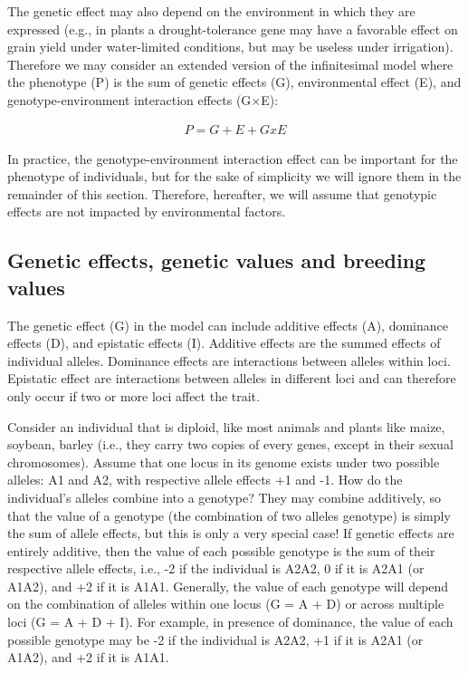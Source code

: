 \documentclass[
]{book}
\begin{document}
The genetic effect may also depend on the environment in which they are expressed (e.g., in plants a drought-tolerance gene may have a favorable effect on grain yield under water-limited conditions, but may be useless under irrigation). Therefore we may consider an extended version of the infinitesimal model where the phenotype (P) is the sum of genetic effects (G), environmental effect (E), and genotype-environment interaction effects (G×E):

\begin{align}
P = G + E + GxE
\end{align}

In practice, the genotype-environment interaction effect can be important for the phenotype of individuals, but for the sake of simplicity we will ignore them in the remainder of this section. Therefore, hereafter, we will assume that genotypic effects are not impacted by environmental factors.

\hypertarget{genetic-effects-genetic-values-and-breeding-values}{%
\subsection{Genetic effects, genetic values and breeding values}\label{genetic-effects-genetic-values-and-breeding-values}}

The genetic effect (G) in the model can include additive effects (A), dominance effects (D), and epistatic effects (I). Additive effects are the summed effects of individual alleles. Dominance effects are interactions between alleles within loci. Epistatic effect are interactions between alleles in different loci and can therefore only occur if two or more loci affect the trait.

Consider an individual that is diploid, like most animals and plants like maize, soybean, barley (i.e., they carry two copies of every genes, except in their sexual chromosomes). Assume that one locus in its genome exists under two possible alleles: A1 and A2, with respective allele effects +1 and -1. How do the individual's alleles combine into a genotype? They may combine additively, so that the value of a genotype (the combination of two alleles genotype) is simply the sum of allele effects, but this is only a very special case! If genetic effects are entirely additive, then the value of each possible genotype is the sum of their respective allele effects, i.e., -2 if the individual is A2A2, 0 if it is A2A1 (or A1A2), and +2 if it is A1A1. Generally, the value of each genotype will depend on the combination of alleles within one locus (G = A + D) or across multiple loci (G = A + D + I). For example, in presence of dominance, the value of each possible genotype may be -2 if the individual is A2A2, +1 if it is A2A1 (or A1A2), and +2 if it is A1A1.
\end{document}
